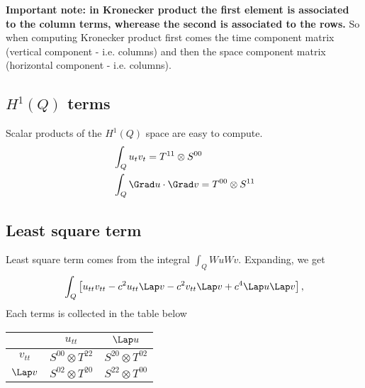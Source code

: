 \documentclass[]{report}
\begin{document}
    {\bfseries Important note: in Kronecker product the first element is associated to the column terms, wherease the second is associated to the rows.} So when computing Kronecker product first comes the time component matrix (vertical component - i.e. columns) and then the space component matrix (horizontal component - i.e. columns).
    
    \subsection*{$H^1(Q)$ terms}
    Scalar products of the $H^1(Q)$ space are easy to compute.
    \begin{align*}
        &\int_Q u_tv_t = T^{11} \otimes S^{00}\\
        &\int_Q \Grad u \cdot \Grad v =  T^{00} \otimes S^{11}
    \end{align*}

    \subsection*{Least square term}
    Least square term comes from the integral $\int_Q Wu Wv$. Expanding, we get
    \begin{equation*}
        \int_Q \left[ u_{tt} v_{tt} - c^2 u_{tt} \Lap v - c^2 v_{tt} \Lap v +c^4 \Lap u \Lap v \right],
    \end{equation*}
    Each terms is collected in the table below
    \begin{center}
        \begin{tabular}[]{|c||c|c|}
            \hline
                        & $u_{tt}$    & $\Lap u$ \\
            \hline \hline
            $v_{tt}$    & $S^{00} \otimes T^{22}$ & $S^{20} \otimes T^{02}$ \\
            \hline
            $\Lap v$    & $S^{02} \otimes T^{20}$ & $S^{22} \otimes T^{00}$ \\
            \hline
        \end{tabular}
    \end{center}
\end{document}
